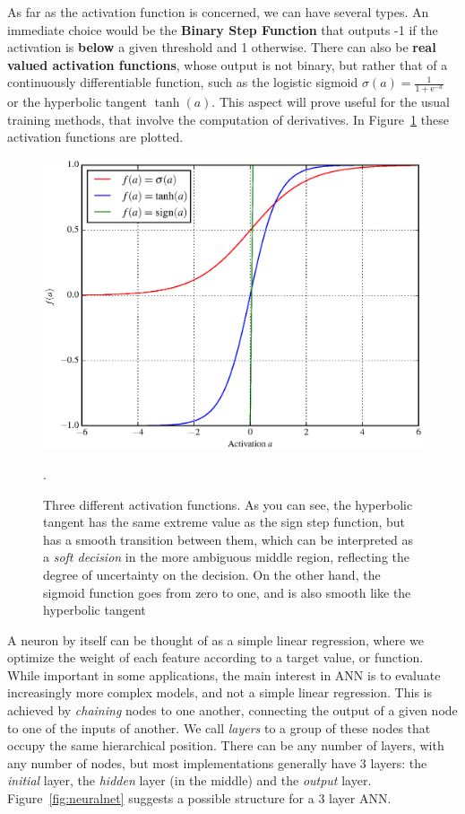 As far as the activation function is concerned, we can have several types. An immediate choice would be the \textbf{Binary Step Function} that  outputs -1 if the activation is \textbf{below} a given threshold and 1 otherwise. There can also be \textbf{real valued activation functions}, whose output is not binary, but rather that of a continuously differentiable function, such as the logistic sigmoid $\sigma(a) = \frac{1}{1 + \mathrm{e}^{-a}}$ or the hyperbolic tangent $\tanh(a)$. This aspect will prove useful for the usual training methods, that involve the computation of derivatives. In Figure~\ref{fig:activFunc} these activation functions are plotted.

\begin{figure}[H]
	\centering
	\includegraphics[width=0.9\linewidth]{figures/activFunc.eps}
	\caption{Three different activation functions. As you can see, the hyperbolic tangent has the same extreme value as the sign step function, but has a smooth transition between them, which can be interpreted as a \emph{soft decision} in the more ambiguous middle region, reflecting the degree of uncertainty on the decision. On the other hand, the sigmoid function goes from zero to one, and is also smooth like the hyperbolic tangent}.
	\label{fig:activFunc}
\end{figure}


A neuron by itself can be thought of as a simple linear regression, where we optimize the weight of each feature according to a target value, or function. While important in some applications, the main interest in ANN is to evaluate increasingly more complex models, and not a simple linear regression. This is achieved by \emph{chaining} nodes to one another, connecting the output of a given node to one of the inputs of another. We call \emph{layers} to a group of these nodes that occupy the same hierarchical position. There can be any number of layers, with any number of nodes, but most implementations generally have 3 layers: the \emph{initial} layer, the \emph{hidden} layer (in the middle) and the \emph{output} layer. Figure~\ref{fig:neuralnet} suggests a possible structure for a 3 layer ANN. 


